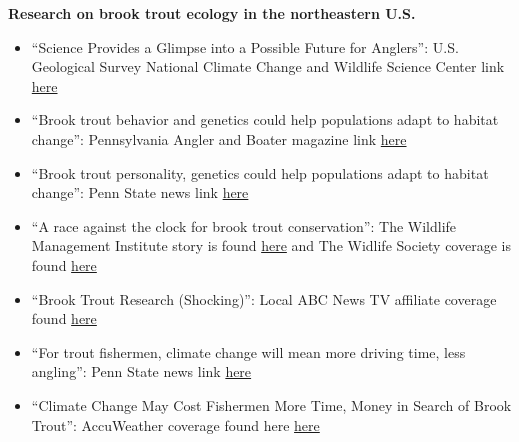 \documentclass[10pt]{article}
\begin{document}
\begin{flushleft}
\textbf{Research on brook trout ecology in the northeastern U.S.}\\
\begin{itemize}
\item ``Science Provides a Glimpse into a Possible Future for Anglers'': U.S. Geological Survey National Climate Change and Wildlife Science Center link
\href{https://nccwsc.usgs.gov/content/science-provides-glimpse-possible-future-anglers}{here}\\
\item ``Brook trout behavior and genetics could help populations adapt to habitat change'': Pennsylvania Angler and Boater magazine link
\href{http://www.fishandboat.com/Transact/AnglerBoater/AnglerBoater2017/MayJune/Documents/2017-0506mj-10brook.pdf}{here}\\
\item ``Brook trout personality, genetics could help populations adapt to habitat change'': Penn State news link 
\href{http://news.psu.edu/story/442050/2016/12/13/brook-trout-personality-genetics-could-help-populations-adapt-habitat-change}{here}\\
\item ``A race against the clock for brook trout conservation'': The Wildlife Management Institute story is found \href{https://wildlifemanagement.institute/outdoor-news-bulletin/september-2016/race-against-clock-brook-trout-conservation}{here} and The Widlife Society coverage is found
\href{http://wildlife.org/a-race-against-the-clock-for-brook-trout-conservation/}{here}\\
\item ``Brook Trout Research (Shocking)'': Local ABC News TV affiliate coverage found \href{http://wnep.com/2016/09/25/brook-trout-research-shocking/}{here}\\
\item ``For trout fishermen, climate change will mean more driving time, less angling'': Penn State news link
\href{http://news.psu.edu/story/366131/2015/08/20/research/trout-fishermen-climate-change-will-mean-more-driving-time-less}{here}
\item ``Climate Change May Cost Fishermen More Time, Money in Search of Brook Trout'': AccuWeather coverage found here \href{http://www.accuweather.com/en/weather-news/climate-change-brook-trout-fisherman-high-cost/52151933}{here}\\


\end{itemize}
\end{flushleft}
\end{document}
